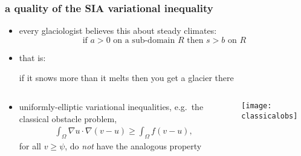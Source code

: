 \documentclass{beamer}
\begin{document}



\begin{frame}
  \frametitle{a quality of the SIA variational inequality} 

\begin{itemize}
\item every glaciologist believes this about steady climates:
	$$\text{if } a > 0 \text{ on a sub-domain } R \text{ then } s > b \text{ on } R$$
\item that is:
\begin{center}
 if it snows more than it melts then you get a glacier there
\end{center}
\end{itemize}

\begin{columns}
\begin{column}{0.6\textwidth}
\begin{itemize}
\small
\item uniformly-elliptic variational inequalities, e.g.~the classical obstacle problem,
\begin{align*}
\int_{\Omega}  \nabla u \cdot \nabla (v - u)  \ge  \int_{\Omega} f (v - u),
\end{align*}
for all $v\ge \psi$, do \emph{not} have the analogous property
\end{itemize}
\end{column}
\begin{column}{0.4\textwidth}
\texttt{[image: classicalobs]}
\end{column}
\end{columns}
\end{frame}
\end{document}
